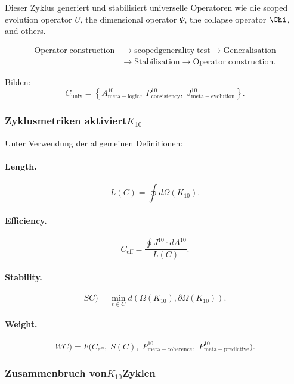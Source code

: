 Dieser Zyklus generiert und stabilisiert universelle Operatoren wie die
scoped evolution operator $U$, the dimensional operator $\Psi$, the
collapse operator $\Chi$, and others.

\[
  \begin{aligned}
  \mathrm{Operator\;construction}
  &\to \mathrm{scoped generality\;test}
  \to \mathrm{Generalisation}\\
  &\to \mathrm{Stabilisation}
  \to \mathrm{Operator\;construction}.
  \end{aligned}
\]

Bilden:
\[
  C_{\mathrm{univ}}
  =
  \left\{
    A^{10}_{\mathrm{meta\!-\!logic}},\;
    P^{10}_{\mathrm{consistency}},\;
    J^{10}_{\mathrm{meta\!-\!evolution}}
  \right\}.
\]


\subsubsection{Zyklusmetriken aktiviert$K_{10}$}

Unter Verwendung der allgemeinen Definitionen:

\paragraph{Length.}
\[
  L(C) = \oint d\Omega(K_{10}).
\]

\paragraph{Efficiency.}
\[
  C_{\mathrm{eff}} =
  \frac{\oint J^{10}\cdot dA^{10}}{L(C)}.
\]

\paragraph{Stability.}
\[
SC)
   = \min_{t\in C}
     d(\Omega(K_{10}), \partial\Omega(K_{10})).
\]

\paragraph{Weight.}
\[
WC)
    = F\big(
        C_{\mathrm{eff}},\;
        S(C),\;
        P^{10}_{\mathrm{meta\!-\!coherence}},\;
        P^{10}_{\mathrm{meta\!-\!predictive}}
      \big).
\]


\subsubsection{Zusammenbruch von$K_{10}$Zyklen}

